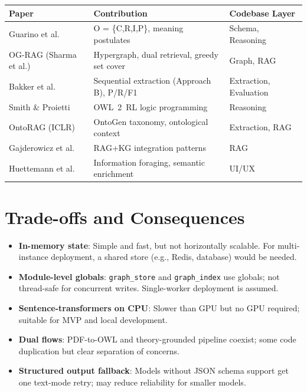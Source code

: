 \documentclass[11pt,a4paper]{article}
\begin{document}
\begin{center}
\begin{tabular}{@{}lll@{}}
\toprule
\textbf{Paper} & \textbf{Contribution} & \textbf{Codebase Layer} \\
\midrule
Guarino et al. & O = \{C,R,I,P\}, meaning postulates & Schema, Reasoning \\
OG-RAG (Sharma et al.) & Hypergraph, dual retrieval, greedy set cover & Graph, RAG \\
Bakker et al. & Sequential extraction (Approach B), P/R/F1 & Extraction, Evaluation \\
Smith \& Proietti & OWL~2~RL logic programming & Reasoning \\
OntoRAG (ICLR) & OntoGen taxonomy, ontological context & Extraction, RAG \\
Gajderowicz et al. & RAG+KG integration patterns & RAG \\
Huettemann et al. & Information foraging, semantic enrichment & UI/UX \\
\bottomrule
\end{tabular}
\end{center}

\section{Trade-offs and Consequences}

\begin{itemize}
    \item \textbf{In-memory state}: Simple and fast, but not horizontally scalable. For multi-instance deployment, a shared store (e.g., Redis, database) would be needed.
    \item \textbf{Module-level globals}: \texttt{graph\_store} and \texttt{graph\_index} use globals; not thread-safe for concurrent writes. Single-worker deployment is assumed.
    \item \textbf{Sentence-transformers on CPU}: Slower than GPU but no GPU required; suitable for MVP and local development.
    \item \textbf{Dual flows}: PDF-to-OWL and theory-grounded pipeline coexist; some code duplication but clear separation of concerns.
    \item \textbf{Structured output fallback}: Models without JSON schema support get one text-mode retry; may reduce reliability for smaller models.
\end{itemize}
\end{document}
